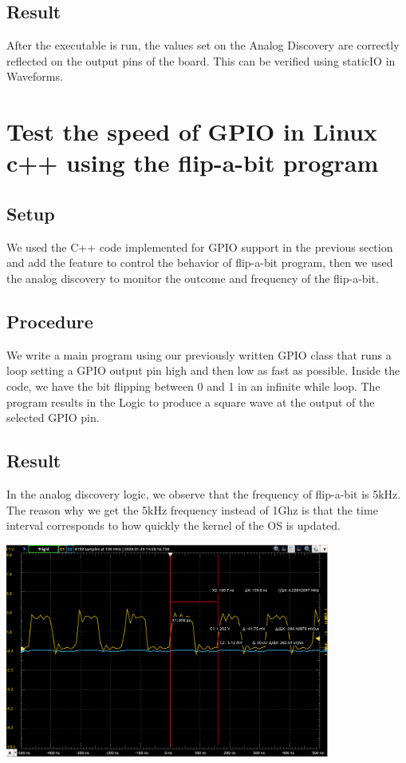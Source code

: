 \documentclass{article}
\begin{document}
\subsection{Result}
After the executable is run, the values set on the Analog Discovery are correctly reflected on the output pins of the board. This can be verified using staticIO in Waveforms.
\clearpage
\section{Test the speed of GPIO in Linux c++ using the flip-a-bit program }
\subsection{Setup}
We used the C++ code implemented for GPIO support in the previous section and add the feature to control the behavior of flip-a-bit program, then we used the analog discovery to monitor the outcome and frequency of the flip-a-bit. 
\subsection{Procedure}
We write a main program using our previously written GPIO class that runs a loop setting a GPIO output pin high and then low as fast as possible. Inside the code, we have the bit flipping between 0 and 1 in an infinite while loop. The program results in the Logic to produce a square wave at the output of the selected GPIO pin.
\subsection{Result}
In the analog discovery logic, we observe that the frequency of flip-a-bit is 5kHz. The reason why we get the 5kHz frequency instead of 1Ghz is that the time interval corresponds to how quickly the kernel of the OS is updated.
\begin{center}
	\includegraphics[width=0.8\textwidth]{img/Lab1_7.PNG}
\end{center}
\clearpage
\end{document}
